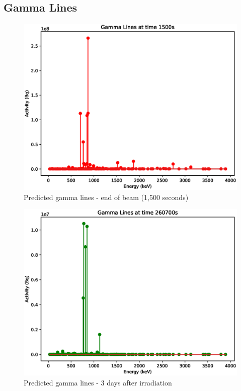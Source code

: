 \FloatBarrier
\clearpage

\subsection{Gamma Lines}

\begin{figure}[htb]
\centering
\includegraphics[width=0.5\linewidth]{chapters/results_activity_code/mo-john-hewett/thick/gammas/0100_1500.eps}
\caption{Predicted gamma lines - end of beam (1,500 seconds)}
\label{fig:mogammalines1500s}
\end{figure}

\begin{figure}[htb]
\centering
\includegraphics[width=0.5\linewidth]{chapters/results_activity_code/mo-john-hewett/thick/gammas/0400_260700.eps}
\caption{Predicted gamma lines - 3 days after irradiation}
\label{fig:mogammalines3days}
\end{figure}



